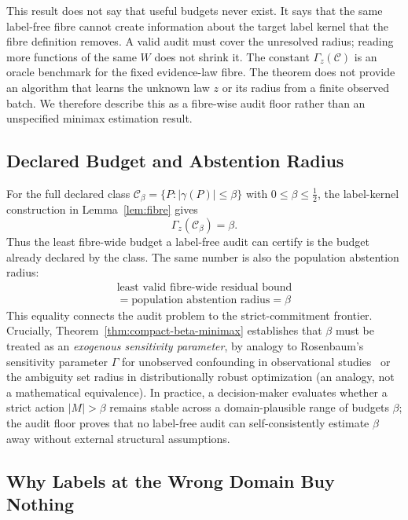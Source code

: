 This result does not say that useful budgets never exist. It says that the same label-free fibre
cannot create information about the target label kernel that the fibre definition removes. A valid
audit must cover the unresolved radius; reading more functions of the same $W$ does not shrink it.
The constant $\Gamma_z(\mathcal C)$ is an oracle benchmark for the fixed evidence-law fibre.
The theorem does not provide an algorithm that learns the unknown law $z$ or its radius from a
finite observed batch. We therefore describe this as a fibre-wise audit floor rather than an
unspecified minimax estimation result.

\subsection{Declared Budget and Abstention Radius}

For the full declared class
$\mathcal C_\beta=\{P:|\gamma(P)|\le\beta\}$ with
$0\le\beta\le\tfrac12$, the label-kernel construction in
Lemma~\ref{lem:fibre} gives
\begin{equation}
 \Gamma_z(\mathcal C_\beta)=\beta.
 \label{eq:compact-beta-radius}
\end{equation}
Thus the least fibre-wide budget a label-free audit can certify is the budget already declared by
the class. The same number is also the population abstention radius:
\[
 \boxed{\begin{gathered}
 \text{least valid fibre-wide residual bound}\\
 =\text{population abstention radius}=\beta
 \end{gathered}}
\]
This equality connects the audit problem to the strict-commitment frontier. Crucially,
Theorem~\ref{thm:compact-beta-minimax} establishes that $\beta$ must be treated as an
\emph{exogenous sensitivity parameter}, by analogy to Rosenbaum's sensitivity
parameter $\Gamma$ for unobserved confounding in observational studies~\cite{rosenbaum2002observational}
or the ambiguity set radius in distributionally robust optimization (an analogy, not a mathematical
equivalence). In practice, a decision-maker
evaluates whether a strict action $|M| > \beta$ remains stable across a domain-plausible range of
budgets $\beta$; the audit floor proves that no label-free audit can self-consistently estimate
$\beta$ away without external structural assumptions.

\subsection{Why Labels at the Wrong Domain Buy Nothing}
\label{sec:compact-wrong-domain}

